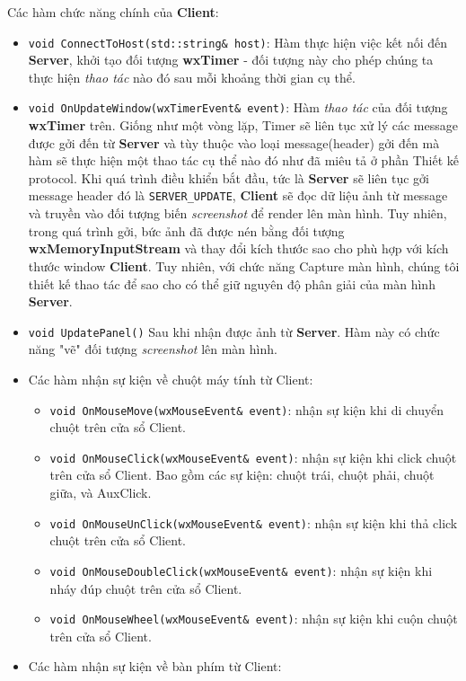 Các hàm chức năng chính của \textbf{Client}: 
\begin{itemize}
	\item \lstinline{void ConnectToHost(std::string& host)}: Hàm thực hiện việc kết nối đến \textbf{Server}, khởi tạo đối tượng \textbf{wxTimer} - đối tượng này cho phép chúng ta thực hiện \textit{thao tác} nào đó sau mỗi khoảng thời gian cụ thể. 
	\item \lstinline{void OnUpdateWindow(wxTimerEvent& event)}: Hàm \textit{thao tác} của đối tượng \textbf{wxTimer} trên. Giống như một vòng lặp, Timer sẽ liên tục xử lý các message được gởi đến từ \textbf{Server} và tùy thuộc vào loại message(header) gởi đến mà hàm sẽ thực hiện một thao tác cụ thể nào đó như đã miêu tả ở phần Thiết kế protocol. Khi quá trình điều khiển bắt đầu, tức là \textbf{Server} sẽ liên tục gởi message header đó là \verb|SERVER_UPDATE|, \textbf{Client} sẽ đọc dữ liệu ảnh từ message và truyền vào đối tượng biến \textit{screenshot} để render lên màn hình. Tuy nhiên, trong quá trình gởi, bức ảnh đã được nén bằng đối tượng \textbf{wxMemoryInputStream} và thay đổi kích thước sao cho phù hợp với kích thước window \textbf{Client}. Tuy nhiên, với chức năng Capture màn hình, chúng tôi thiết kế thao tác để sao cho có thể giữ nguyên độ phân giải của màn hình \textbf{Server}.
	\item \lstinline{void UpdatePanel()} Sau khi nhận được ảnh từ \textbf{Server}. Hàm này có chức năng "vẽ" đối tượng \textit{screenshot} lên màn hình. 
	\item Các hàm nhận sự kiện về chuột máy tính từ Client:
		\begin{itemize}
			\item[] \lstinline{void OnMouseMove(wxMouseEvent& event)}: nhận sự kiện khi di chuyển chuột trên cửa sổ Client.
			\item[] \lstinline{void OnMouseClick(wxMouseEvent& event)}: nhận sự kiện khi click chuột trên cửa sổ Client. Bao gồm các sự kiện: chuột trái, chuột phải, chuột giữa, và AuxClick.
			\item[] \lstinline{void OnMouseUnClick(wxMouseEvent& event)}: nhận sự kiện khi thả click chuột trên cửa sổ Client.
			\item[] \lstinline{void OnMouseDoubleClick(wxMouseEvent& event)}: nhận sự kiện khi nháy đúp chuột trên cửa sổ Client.
			\item[] \lstinline{void OnMouseWheel(wxMouseEvent& event)}: nhận sự kiện khi cuộn chuột trên cửa sổ Client.
		\end{itemize}
	\item Các hàm nhận sự kiện về bàn phím từ Client:

\end{itemize}
